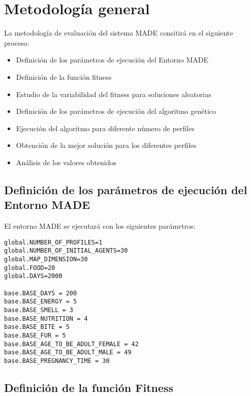 



\chapter{Metodología general}
\label{cha:Overall methodology}

La metodología de evaluación del sistema MADE consitirá en el siguiente proceso:

\begin{itemize}
 \item Definición de los parámetros de ejecución del Entorno MADE
 \item Definición de la función fitness
 \item Estudio de la variabilidad del fitness para soluciones aleatorias
 \item Definición de los parámetros de ejecución del algoritmo genético
 \item Ejecución del algoritmo para diferente número de perfiles
 \item Obtención de la mejor solución para los diferentes perfiles
 \item Análisis de los valores obtenidos
\end{itemize}

\section{Definición de los parámetros de ejecución del Entorno MADE}

El entorno MADE se ejecutará con los siguientes parámetros:

\begin{verbatim}
global.NUMBER_OF_PROFILES=1
global.NUMBER_OF_INITIAL_AGENTS=30
global.MAP_DIMENSION=30
global.FOOD=20
global.DAYS=2000

base.BASE_DAYS = 200
base.BASE_ENERGY = 5
base.BASE_SMELL = 3
base.BASE_NUTRITION = 4
base.BASE_BITE = 5
base.BASE_FUR = 5
base.BASE_AGE_TO_BE_ADULT_FEMALE = 42
base.BASE_AGE_TO_BE_ADULT_MALE = 49
base.BASE_PREGNANCY_TIME = 30
\end{verbatim}

\section{Definición de la función Fitness}





